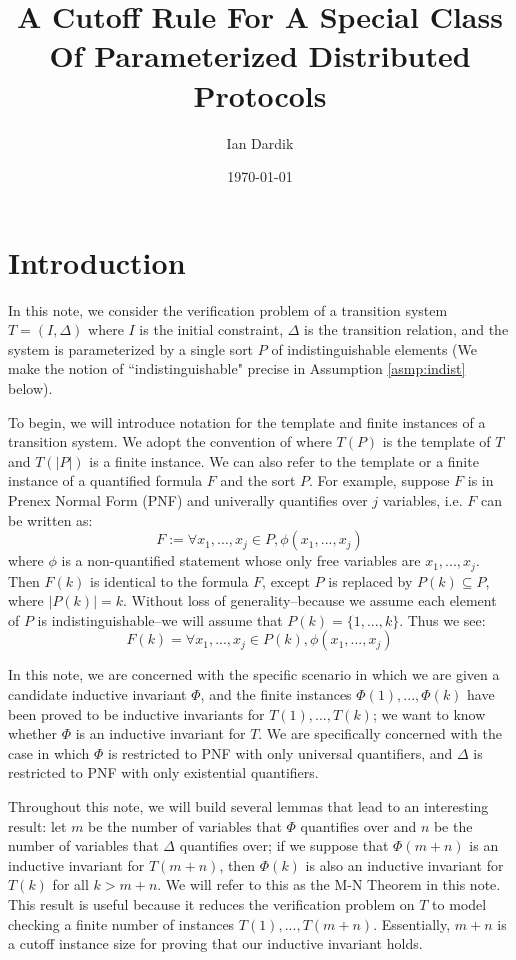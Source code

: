 \documentclass[12pt]{article}
\title{A Cutoff Rule For A Special Class Of Parameterized Distributed Protocols}
\author{Ian Dardik}
\date{\today}
\theoremstyle{definition}
\theoremstyle{remark}
\begin{document}
\maketitle

\section{Introduction}
In this note, we consider the verification problem of a transition system $T=(I,\Delta)$ where $I$ is the initial constraint, $\Delta$ is the transition relation, and the system is parameterized by a single sort $P$ of indistinguishable elements (We make the notion of ``indistinguishable" precise in Assumption \ref{asmp:indist} below).  

To begin, we will introduce notation for the template and finite instances of a transition system.  We adopt the convention of \cite{goel2021symmetry} where $T(P)$ is the template of $T$ and $T(|P|)$ is a finite instance.  We can also refer to the template or a finite instance of a quantified formula $F$ and the sort $P$.  For example, suppose $F$ is in Prenex Normal Form (PNF) and univerally quantifies over $j$ variables, i.e. $F$ can be written as:
$$F := \forall x_1,...,x_j \in P, \phi(x_1,...,x_j)$$
where $\phi$ is a non-quantified statement whose only free variables are $x_1,...,x_j$.  Then $F(k)$ is identical to the formula $F$, except $P$ is replaced by $P(k) \subseteq P$, where $|P(k)|=k$.  Without loss of generality--because we assume each element of $P$ is indistinguishable--we will assume that $P(k)=\{1,...,k\}$.  Thus we see:
$$F(k) = \forall x_1,...,x_j \in P(k), \phi(x_1,...,x_j)$$

In this note, we are concerned with the specific scenario in which we are given a candidate inductive invariant $\Phi$, and the finite instances $\Phi(1),...,\Phi(k)$ have been proved to be inductive invariants for $T(1),...,T(k)$; we want to know whether $\Phi$ is an inductive invariant for $T$.  We are specifically concerned with the case in which $\Phi$ is restricted to PNF with only universal quantifiers, and $\Delta$ is restricted to PNF with only existential quantifiers.

Throughout this note, we will build several lemmas that lead to an interesting result: let $m$ be the number of variables that $\Phi$ quantifies over and $n$ be the number of variables that $\Delta$ quantifies over; if we suppose that $\Phi(m+n)$ is an inductive invariant for $T(m+n)$, then $\Phi(k)$ is also an inductive invariant for $T(k)$ for all $k>m+n$.  We will refer to this as the M-N Theorem in this note.  This result is useful because it reduces the verification problem on $T$ to model checking a finite number of instances $T(1),...,T(m+n)$.  Essentially, $m+n$ is a cutoff instance size for proving that our inductive invariant holds.
\end{document}
